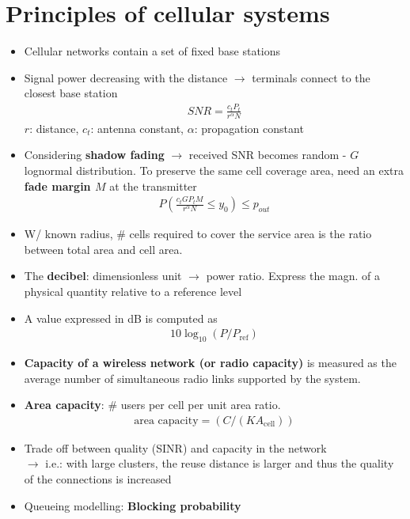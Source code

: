 \section{Principles of cellular systems}
\begin{itemize}
	\item Cellular networks contain a set of fixed base stations
	\item Signal power decreasing with the distance $\rightarrow$ terminals connect to the closest base station
	\begin{align*}
		SNR = \frac{c_t P_t}{r^{\alpha} N}
	\end{align*}
	$r$: distance, $c_t$: antenna constant, $\alpha$: propagation constant 
	\item Considering \textbf{shadow fading} $\rightarrow$ received SNR becomes random - $G$ lognormal distribution. To preserve the same cell coverage area, need an extra \textbf{fade margin $M$} at the transmitter
	\begin{align*}
		P \left(
			\frac{c_t G P_t M}{r^{\alpha} N} \leq y_0
		\right)	\leq p_{out}
	\end{align*}
	\item W/ known radius, \# cells required to cover the service area is the ratio between total area and cell area.
	\item The \textbf{decibel}: dimensionless unit $\rightarrow$ power ratio. Express the magn. of a physical quantity relative to a reference level
	\item A value expressed in dB is computed as
	\begin{align*}
		10 \log_{10} (P/P_{\text{ref}})
	\end{align*}
	\item \textbf{Capacity of a wireless network (or radio capacity)} is measured as the average number of simultaneous radio links supported by the system.
	\item \textbf{Area capacity}: \# users per cell per unit area ratio.
	\begin{align}
		\text{area capacity} = (C/(K A_{\text{cell}}))
	\end{align}
	\item Trade off between quality (SINR) and capacity in the network \\
	$\rightarrow$ i.e.: with large clusters, the reuse distance is larger and thus the quality of the connections is increased
	\item Queueing modelling: \textbf{Blocking probability}

\end{itemize}
